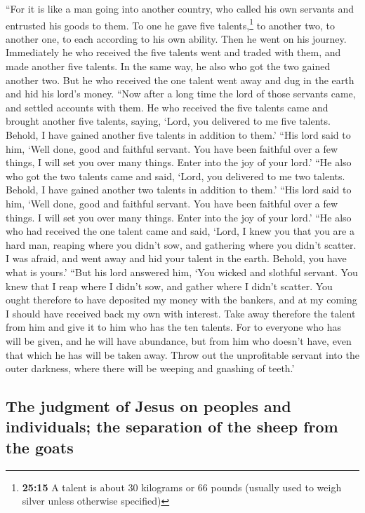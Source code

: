  ``For it is like a man going into another country, who
called his own servants and entrusted his goods to them. 
To one he gave five talents,\footnote{\textbf{25:15} A talent is about
  30 kilograms or 66 pounds (usually used to weigh silver unless
  otherwise specified)} to another two, to another one, to each
according to his own ability. Then he went on his journey.
 Immediately he who received the five talents went and
traded with them, and made another five talents.  In the
same way, he also who got the two gained another two. 
But he who received the one talent went away and dug in the earth and
hid his lord's money.  ``Now after a long time the lord
of those servants came, and settled accounts with them. 
He who received the five talents came and brought another five talents,
saying, `Lord, you delivered to me five talents. Behold, I have gained
another five talents in addition to them.'  ``His lord
said to him, `Well done, good and faithful servant. You have been
faithful over a few things, I will set you over many things. Enter into
the joy of your lord.'  ``He also who got the two talents
came and said, `Lord, you delivered to me two talents. Behold, I have
gained another two talents in addition to them.'  ``His
lord said to him, `Well done, good and faithful servant. You have been
faithful over a few things. I will set you over many things. Enter into
the joy of your lord.'  ``He also who had received the
one talent came and said, `Lord, I knew you that you are a hard man,
reaping where you didn't sow, and gathering where you didn't scatter.
 I was afraid, and went away and hid your talent in the
earth. Behold, you have what is yours.'  ``But his lord
answered him, `You wicked and slothful servant. You knew that I reap
where I didn't sow, and gather where I didn't scatter. 
You ought therefore to have deposited my money with the bankers, and at
my coming I should have received back my own with interest.
 Take away therefore the talent from him and give it to
him who has the ten talents.  For to everyone who has
will be given, and he will have abundance, but from him who doesn't
have, even that which he has will be taken away.  Throw
out the unprofitable servant into the outer darkness, where there will
be weeping and gnashing of teeth.'

\hypertarget{the-judgment-of-jesus-on-peoples-and-individuals-the-separation-of-the-sheep-from-the-goats}{%
\subsection{The judgment of Jesus on peoples and individuals; the
separation of the sheep from the
goats}\label{the-judgment-of-jesus-on-peoples-and-individuals-the-separation-of-the-sheep-from-the-goats}}

